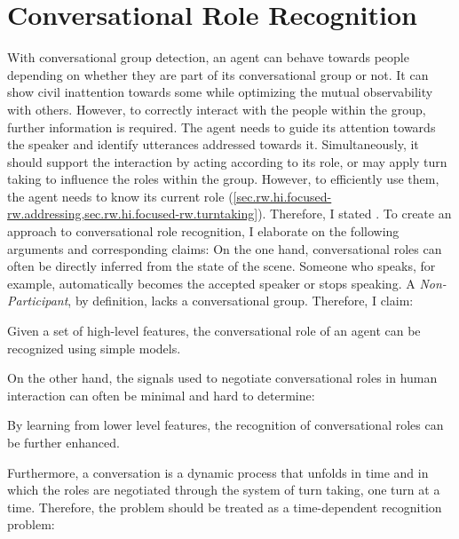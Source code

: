 \chapter{Conversational Role Recognition}\label{ch.roles}

With \gls{conversational group} detection, an agent can behave towards people depending on whether they are part of its \gls{conversational group} or not.
It can show \gls{civil inattention} towards some while optimizing the mutual observability with others.
However, to correctly interact with the people within the group, further information is required.
The agent needs to guide its attention towards the \gls{speaker} and identify utterances addressed towards it. 
Simultaneously, it should support the interaction by acting according to its role, or may apply \gls{turn taking} to influence the roles within the group.
However, to efficiently use them, the agent needs to know its current role (\cref{sec.rw.hi.focused-rw.addressing,sec.rw.hi.focused-rw.turntaking}). 
Therefore, I stated .
To create an approach to \gls{conversational role} recognition, I elaborate on the following arguments and corresponding claims:
On the one hand, \glspl{conversational role} can often be directly inferred from the state of the scene.
Someone who speaks, for example, automatically becomes the accepted \gls{speaker} or stops speaking.
A \emph{Non-Participant}, by definition, lacks a \gls{conversational group}.
Therefore, I claim:
\newcommand{\hyprolerule}{Given a set of high-level features, the \gls{conversational role} of an agent can be recognized using simple models.}
\begin{hyp3}
    \label{role.rule}
    \hyprolerule
\end{hyp3}
On the other hand, the signals used to negotiate \glspl{conversational role} in human interaction can often be minimal and hard to determine:
\newcommand{\hyproleraw}{By learning from lower level features, the recognition of \glspl{conversational role} can be further enhanced.}
\begin{hyp3}
    \label{role.raw}
    \hyproleraw
\end{hyp3}
Furthermore, a \gls{conversation} is a dynamic process that unfolds in time and in which the roles are negotiated through the system of \gls{turn} taking, one \gls{turn} at a time.
Therefore, the problem should be treated as a time-dependent recognition problem:
\newcommand{\hyproletime}{By observing how the interaction unfolds in time, the \gls{conversational role} can be better recognized than from the latest observation alone.}
